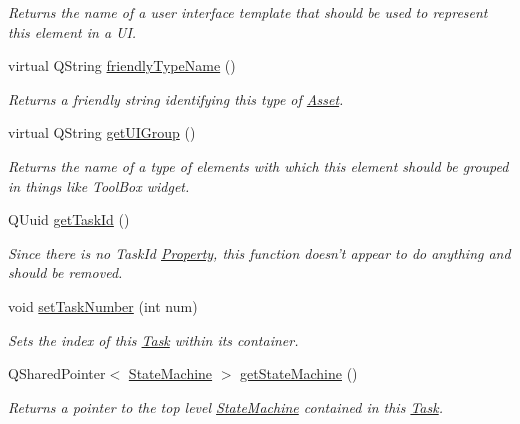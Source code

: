 \begin{DoxyCompactItemize}
\begin{DoxyCompactList}\small\item\em Returns the name of a user interface template that should be used to represent this element in a U\-I. \end{DoxyCompactList}\item 
virtual Q\-String \hyperlink{class_picto_1_1_task_a113fbbe20cce93b87fabe1221c0e7c70}{friendly\-Type\-Name} ()
\begin{DoxyCompactList}\small\item\em Returns a friendly string identifying this type of \hyperlink{class_picto_1_1_asset}{Asset}. \end{DoxyCompactList}\item 
\hypertarget{class_picto_1_1_task_a316d6295cc620fb10004a2c40ac7dd49}{virtual Q\-String \hyperlink{class_picto_1_1_task_a316d6295cc620fb10004a2c40ac7dd49}{get\-U\-I\-Group} ()}\label{class_picto_1_1_task_a316d6295cc620fb10004a2c40ac7dd49}

\begin{DoxyCompactList}\small\item\em Returns the name of a type of elements with which this element should be grouped in things like Tool\-Box widget. \end{DoxyCompactList}\item 
\hypertarget{class_picto_1_1_task_a10a6eb3eab48de1aa8f498f405b63b72}{Q\-Uuid \hyperlink{class_picto_1_1_task_a10a6eb3eab48de1aa8f498f405b63b72}{get\-Task\-Id} ()}\label{class_picto_1_1_task_a10a6eb3eab48de1aa8f498f405b63b72}

\begin{DoxyCompactList}\small\item\em Since there is no Task\-Id \hyperlink{class_picto_1_1_property}{Property}, this function doesn't appear to do anything and should be removed. \end{DoxyCompactList}\item 
void \hyperlink{class_picto_1_1_task_aea4b74597bf60f627b5bae545b29ab3f}{set\-Task\-Number} (int num)
\begin{DoxyCompactList}\small\item\em Sets the index of this \hyperlink{class_picto_1_1_task}{Task} within its container. \end{DoxyCompactList}\item 
\hypertarget{class_picto_1_1_task_a384aa105ec4ce395afced4b136cc9f6a}{Q\-Shared\-Pointer$<$ \hyperlink{class_picto_1_1_state_machine}{State\-Machine} $>$ \hyperlink{class_picto_1_1_task_a384aa105ec4ce395afced4b136cc9f6a}{get\-State\-Machine} ()}\label{class_picto_1_1_task_a384aa105ec4ce395afced4b136cc9f6a}

\begin{DoxyCompactList}\small\item\em Returns a pointer to the top level \hyperlink{class_picto_1_1_state_machine}{State\-Machine} contained in this \hyperlink{class_picto_1_1_task}{Task}. \end{DoxyCompactList}\end{DoxyCompactItemize}
